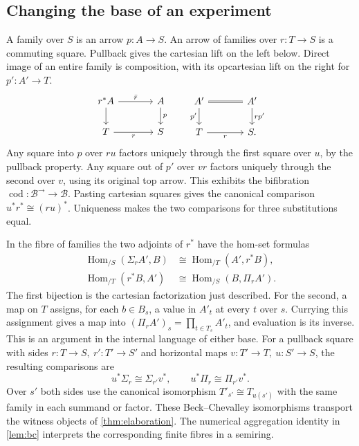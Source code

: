 \documentclass[11pt,a4paper]{article}
\theoremstyle{definition}
\theoremstyle{remark}\newaliascnt{remark}{theorem}
\newcommand{\Hom}{\operatorname{Hom}}
\numberwithin{equation}{section}
\begin{document}
\subsection{Changing the base of an experiment}
A family over \(S\) is an arrow \(p:A\to S\). An arrow of families over \(r:T\to S\) is a commuting square. Pullback gives the cartesian lift on the left below. Direct image of an entire family is composition, with its opcartesian lift on the right for \(p':A'\to T\).
\[
\begin{tikzcd}[column sep=large]
 r^*A\arrow[r,"\bar r"]\arrow[d]&A\arrow[d,"p"]\\
 T\arrow[r,"r"']&S
\end{tikzcd}
\qquad
\begin{tikzcd}[column sep=large]
 A'\arrow[r,equal]\arrow[d,"p'"']&A'\arrow[d,"rp'"]\\
 T\arrow[r,"r"']&S .
\end{tikzcd}
\]
Any square into \(p\) over \(ru\) factors uniquely through the first square over \(u\), by the pullback property. Any square out of \(p'\) over \(vr\) factors uniquely through the second over \(v\), using its original top arrow. This exhibits the bifibration \(\operatorname{cod}:\mathcal B^{\to}\to\mathcal B\). Pasting cartesian squares gives the canonical comparison \(u^*r^*\cong(ru)^*\). Uniqueness makes the two comparisons for three substitutions equal.

In the fibre of families the two adjoints of \(r^*\) have the hom-set formulas
\[
\begin{aligned}
 \Hom_{/S}(\Sigma_r A',B)&\cong\Hom_{/T}(A',r^*B),\\
 \Hom_{/T}(r^*B,A')&\cong\Hom_{/S}(B,\Pi_r A').
\end{aligned}
\]
The first bijection is the cartesian factorization just described. For the second, a map on \(T\) assigns, for each \(b\in B_s\), a value in \(A'_t\) at every \(t\) over \(s\). Currying this assignment gives a map into \((\Pi_r A')_s=\prod_{t\in T_s}A'_t\), and evaluation is its inverse. This is an argument in the internal language of either base. For a pullback square with sides \(r:T\to S,\ r':T'\to S'\) and horizontal maps \(v:T'\to T,\ u:S'\to S\), the resulting comparisons are
\[
 u^*\Sigma_r\cong\Sigma_{r'}v^*,\qquad
 u^*\Pi_r\cong\Pi_{r'}v^* .
\]
Over \(s'\) both sides use the canonical isomorphism \(T'_{s'}\cong T_{u(s')}\) with the same family in each summand or factor. These Beck--Chevalley isomorphisms transport the witness objects of \cref{thm:elaboration}. The numerical aggregation identity in \cref{lem:bc} interprets the corresponding finite fibres in a semiring.
\end{document}
